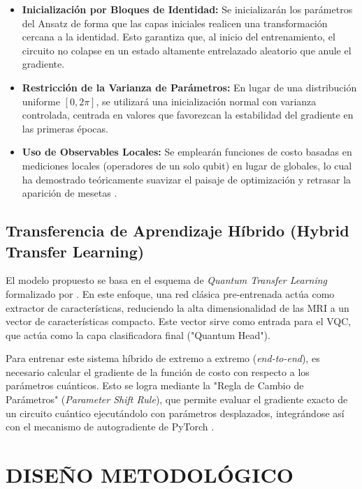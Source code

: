 \documentclass[12pt,letterpaper]{article}
\begin{document}
    \begin{itemize}
        \item \textbf{Inicialización por Bloques de Identidad:} Se inicializarán los parámetros del Ansatz de forma que las capas iniciales realicen una transformación cercana a la identidad. Esto garantiza que, al inicio del entrenamiento, el circuito no colapse en un estado altamente entrelazado aleatorio que anule el gradiente.
        \item \textbf{Restricción de la Varianza de Parámetros:} En lugar de una distribución uniforme $[0, 2\pi]$, se utilizará una inicialización normal con varianza controlada, centrada en valores que favorezcan la estabilidad del gradiente en las primeras épocas.
        \item \textbf{Uso de Observables Locales:} Se emplearán funciones de costo basadas en mediciones locales (operadores de un solo qubit) en lugar de globales, lo cual ha demostrado teóricamente suavizar el paisaje de optimización y retrasar la aparición de mesetas \citep{Cerezo2021bp}.
    \end{itemize}

    \subsection{Transferencia de Aprendizaje Híbrido (Hybrid Transfer Learning)}
    \vspace{-0.5cm}
    El modelo propuesto se basa en el esquema de \textit{Quantum Transfer Learning} formalizado por \citet{mari_qtl_2020}. En este enfoque, una red clásica pre-entrenada actúa como extractor de características, reduciendo la alta dimensionalidad de las MRI a un vector de características compacto. Este vector sirve como entrada para el VQC, que actúa como la capa clasificadora final ("Quantum Head").

    Para entrenar este sistema híbrido de extremo a extremo (\textit{end-to-end}), es necesario calcular el gradiente de la función de costo con respecto a los parámetros cuánticos. Esto se logra mediante la "Regla de Cambio de Parámetros" (\textit{Parameter Shift Rule}), que permite evaluar el gradiente exacto de un circuito cuántico ejecutándolo con parámetros desplazados, integrándose así con el mecanismo de autogradiente de PyTorch \citep{bergholm2018pennylane}.

    \newpage
    \section{DISEÑO METODOLÓGICO}
    \vspace{-0.5cm}
    
\end{document}

